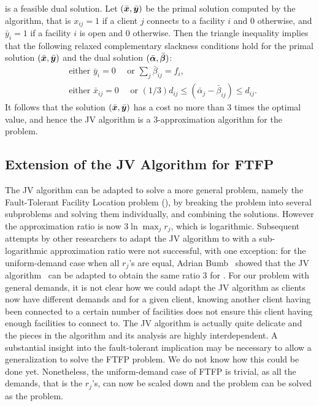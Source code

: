 \documentclass[oneside,final]{ucr}
\begin{document}
is a feasible dual solution. Let $(\bar{\boldsymbol{x}},\bar{\boldsymbol{y}})$ be
the primal solution computed by the algorithm, that is
$x_{ij}=1$ if a client $j$ connects to a facility $i$ and 0
otherwise, and $\bar y_i = 1$ if a facility $i$ is open and
0 otherwise. Then the triangle inequality implies that the
following relaxed complementary slackness conditions hold
for the primal solution $(\bar{\boldsymbol{x}},\bar{\boldsymbol{y}})$ and the dual
solution $(\bar{\boldsymbol{\alpha}}, \bar{\boldsymbol{\beta}})$:
\begin{align*}
  &\text{either } \bar y_i = 0 \quad \text{ or } \sum_{j}
  \bar\beta_{ij} =  f_i,\\
  &\text{either } \bar x_{ij} = 0 \quad \text{ or } (1/3)
  d_{ij} \leq (\bar\alpha_j - \bar\beta_{ij}) \leq d_{ij}.
\end{align*}
It follows that the solution $(\bar{\boldsymbol{x}},\bar{\boldsymbol{y}})$ has a
cost no more than $3$ times the optimal value, and hence the
JV algorithm is a $3$-approximation algorithm for the {\UFL}
problem.

\subsection{Extension of the JV Algorithm for FTFP}
The JV algorithm can be adapted to solve a more general
problem, namely the Fault-Tolerant Facility Location problem
({\FTFL}), by breaking the problem into several subproblems
and solving them individually, and combining the
solutions. However the approximation ratio is now $3\ln
\max_j r_j$, which is logarithmic. Subsequent attempts by
other researchers to adapt the JV algorithm to {\FTFL}
with a sub-logarithmic approximation ratio were not
successful, with one exception: for the uniform-demand case
when all $r_j$'s are equal, Adrian Bumb~\cite{Bumb02} showed
that the JV algorithm~\cite{JainV01} can be adapted to
obtain the same ratio $3$ for {\FTFL}. For our problem
{\FTFP} with general demands, it is not clear how we could
adapt the JV algorithm as clients now have different demands
and for a given client, knowing another client having been
connected to a certain number of facilities does not ensure
this client having enough facilities to connect to. The JV
algorithm is actually quite delicate and the pieces in the
algorithm and its analysis are highly interdependent. A
substantial insight into the fault-tolerant implication may
be necessary to allow a generalization to solve the FTFP
problem. We do not know how this could be done
yet. Nonetheless, the uniform-demand case of FTFP is
trivial, as all the demands, that is the $r_j$'s, can now be
scaled down and the problem can be solved as the {\UFL}
problem.
\end{document}
